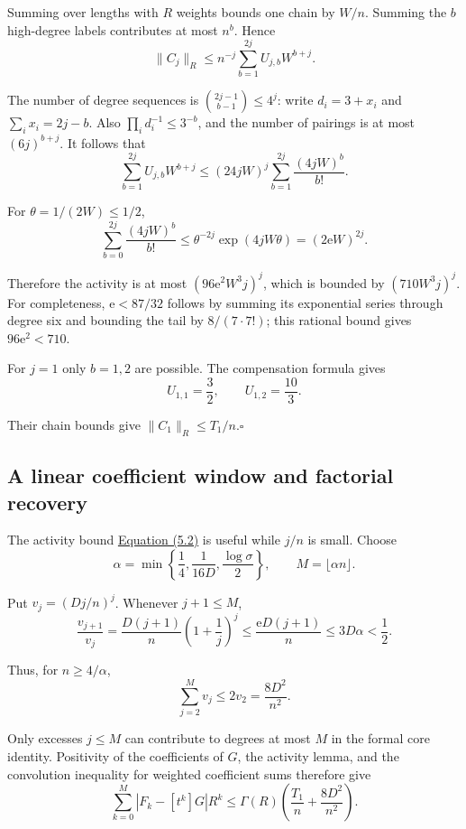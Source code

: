 \documentclass[11pt,a4paper]{article}
\newcommand{\paperref}[2]{\hyperref[#1]{#2}}
\begin{document}
Summing over lengths with \(R\) weights bounds one chain by \(W/n\). Summing the \(b\) high-degree labels contributes at most \(n^b\). Hence
\[\|C_j\|_R\le n^{-j}
\sum_{b=1}^{2j}U_{j,b}W^{b+j}.\]

The number of degree sequences is \(\binom{2j-1}{b-1}\le4^j\): write \(d_i=3+x_i\) and \(\sum_i x_i=2j-b\). Also \(\prod_i d_i^{-1}\le3^{-b}\), and the number of pairings is at most \((6j)^{b+j}\). It follows that
\[\sum_{b=1}^{2j}U_{j,b}W^{b+j}
\le(24jW)^j
\sum_{b=1}^{2j}\frac{(4jW)^b}{b!}.\]

For \(\theta=1/(2W)\le1/2\),
\[\sum_{b=0}^{2j}\frac{(4jW)^b}{b!}
\le\theta^{-2j}\exp(4jW\theta)
=(2\mathrm e W)^{2j}.\]

Therefore the activity is at most \((96\mathrm e^2W^3j)^j\), which is bounded by \((710W^3j)^j\). For completeness, \(\mathrm e<87/32\) follows by summing its exponential series through degree six and bounding the tail by \(8/(7\cdot7!)\); this rational bound gives \(96\mathrm e^2<710\).

For \(j=1\) only \(b=1,2\) are possible. The compensation formula gives
\[U_{1,1}=\frac32,\qquad U_{1,2}=\frac{10}{3}.\]

Their chain bounds give \(\|C_1\|_R\le T_1/n\).\nobreak\hspace{.5em}\mbox{$\square$}

\subsection{A linear coefficient window and factorial recovery}\label{sec-5.4}

The activity bound \paperref{eq-core-activity}{Equation (5.2)} is useful while \(j/n\) is small. Choose
\[\alpha=\min\left\{\frac14,\frac1{16D},\frac{\log\sigma}{2}\right\},
\qquad M=\lfloor\alpha n\rfloor.\]

Put \(v_j=(Dj/n)^j\). Whenever \(j+1\le M\),
\[\frac{v_{j+1}}{v_j}
=\frac{D(j+1)}n\left(1+\frac1j\right)^j
\le\frac{\mathrm e D(j+1)}n
\le3D\alpha<\frac12.\]

Thus, for \(n\ge4/\alpha\),
\[\sum_{j=2}^{M}v_j\le2v_2=\frac{8D^2}{n^2}.\]

Only excesses \(j\le M\) can contribute to degrees at most \(M\) in the formal core identity. Positivity of the coefficients of \(G\), the activity lemma, and the convolution inequality for weighted coefficient sums therefore give
\[\sum_{k=0}^{M}|F_k-[t^k]G|R^k
\le\Gamma(R)\left(\frac{T_1}n+\frac{8D^2}{n^2}\right).\]
\end{document}
